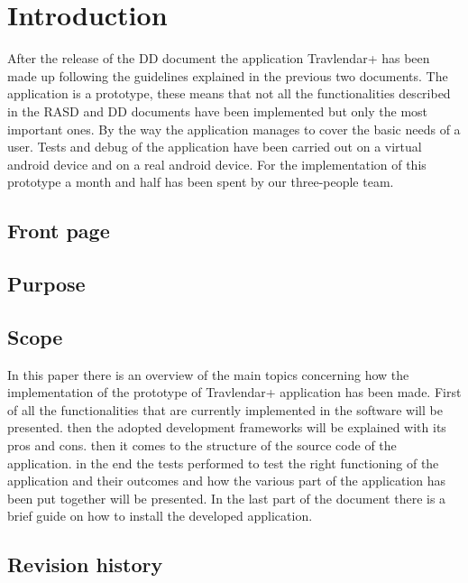 \chapter{Introduction}
After the release of the DD document the application Travlendar+ has been made up following the guidelines explained in the previous two documents. The application is a prototype, these means that not all the functionalities described in the RASD and DD documents have been implemented but only the most important ones. By the way the application manages to cover the basic needs of a user. Tests and debug of the application have been carried out on a virtual android device and on a real android device. For the implementation of this prototype a month and half has been spent by our three-people team.

\section{Front page}

\section{Purpose}

\section{Scope}
In this paper there is an overview of the main topics concerning how the implementation of the prototype of Travlendar+ application has been made. First of all the functionalities that are currently implemented in the software will be presented. then the adopted development frameworks  will be explained with its pros and cons. then it comes to the structure of the source code of the application. in the end the tests performed to test the right functioning of the application and their outcomes and how the various part of the application has been put together will be presented. In the last part of the document there is a brief guide on how to install the developed application.

\section{Revision history}